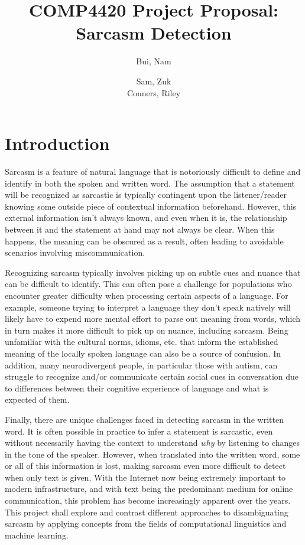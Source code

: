 \documentclass[11pt]{article}
\title{COMP4420 Project Proposal: Sarcasm Detection}
\author{
    Bui, Nam \\
    \email{nam\_bui@student.uml.edu}
    \and
    Sam, Zuk \\
    \email {samuel\_zuk@student.uml.edu}
    Conners, Riley \\
    \email {riley_conners@student.uml.edu}
}
\begin{document}
\maketitle

\section{Introduction}

Sarcasm is a feature of natural language that is notoriously difficult to
define and identify in both the spoken and written word. The assumption that a
statement will be recognized as sarcastic is typically contingent upon the
listener/reader knowing some outside piece of contextual information
beforehand. However, this external information isn't always known, and even
when it is, the relationship between it and the statement at hand may not
always be clear. When this happens, the meaning can be obscured as a result,
often leading to avoidable scenarios involving miscommunication.

Recognizing sarcasm typically involves picking up on subtle cues and
nuance that can be difficult to identify. This can often pose a challenge for
populations who encounter greater difficulty when processing certain aspects of
a language. For example, someone trying to interpret a language they don't
speak natively will likely have to expend more mental effort to parse out
meaning from words, which in turn makes it more difficult to pick up on nuance,
including sarcasm. Being unfamiliar with the cultural norms, idioms, etc. that
inform the established meaning of the locally spoken language can also be a
source of confusion. In addition, many neurodivergent people, in particular
those with autism, can struggle to recognize and/or communicate certain social
cues in conversation due to differences between their cognitive experience of
language and what is expected of them.

Finally, there are unique challenges faced in detecting sarcasm in the
written word. It is often possible in practice to infer a statement is
sarcastic, even without necessarily having the context to understand
\textit{why} by listening to changes in the tone of the speaker. However, when
translated into the written word, some or all of this information is lost,
making sarcasm even more difficult to detect when only text is given. With the
Internet now being extremely important to modern infrastructure, and with text
being the predominant medium for online communication, this problem has become
increasingly apparent over the years. This project shall explore and contrast
different approaches to disambiguating sarcasm by applying concepts from the
fields of computational linguistics and machine learning.
\end{document}
